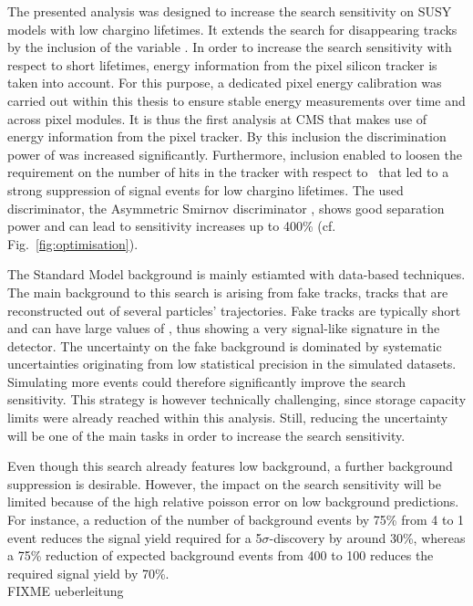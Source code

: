 The presented analysis was designed to increase the search sensitivity on SUSY models with low chargino lifetimes.
It extends the search for disappearing tracks~\cite{bib:CMS:DT_8TeV} by the inclusion of the variable \dedx.
In order to increase the search sensitivity with respect to short lifetimes, energy information from the pixel silicon tracker is taken into account.
For this purpose, a dedicated pixel energy calibration was carried out within this thesis to ensure stable energy measurements over time and across pixel modules.
It is thus the first analysis at CMS that makes use of energy information from the pixel tracker.
By this inclusion the discrimination power of \dedx was increased significantly.
Furthermore, \dedx inclusion enabled to loosen the requirement on the number of hits in the tracker with respect to~\cite{bib:CMS:DT_8TeV} that led to a strong suppression of signal events for low chargino lifetimes. 
The used \dedx discriminator, the Asymmetric Smirnov discriminator \ias, shows good separation power and can lead to sensitivity increases up to 400\% (cf. Fig.~\ref{fig:optimisation}).

The Standard Model background is mainly estiamted with data-based techniques.
The main background to this search is arising from fake tracks, \ie tracks that are reconstructed out of several particles' trajectories.
Fake tracks are typically short and can have large values of \ias, thus showing a very signal-like signature in the detector.
The uncertainty on the fake background is dominated by systematic uncertainties originating from low statistical precision in the simulated datasets.
Simulating more events could therefore significantly improve the search sensitivity.
This strategy is however technically challenging, since storage capacity limits were already reached within this analysis.
Still, reducing the uncertainty will be one of the main tasks in order to increase the search sensitivity.

Even though this search already features low background, a further background suppression is desirable.
However, the impact on the search sensitivity will be limited because of the high relative poisson error on low background predictions.
For instance, a reduction of the number of background events by 75\% from 4 to 1 event reduces the signal yield required for a 5$\sigma$-discovery by around 30\%, whereas a 75\% reduction of expected background events from 400 to 100 reduces the required signal yield by 70\%.\\
FIXME ueberleitung

